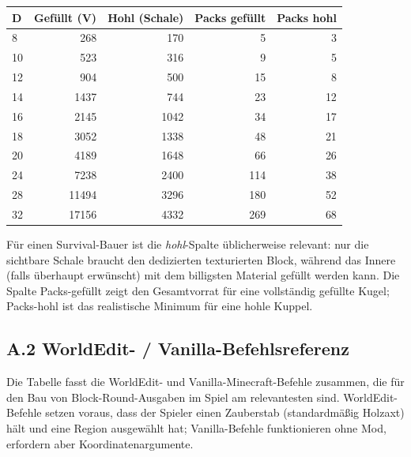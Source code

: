 \documentclass[12pt,a4paper]{scrartcl}
\begin{document}
\vspace{0.4em}
\begin{center}
\begin{tabular}{@{}lrrrr@{}}
\toprule
\textbf{D} & \textbf{Gefüllt (V)} & \textbf{Hohl (Schale)} & \textbf{Packs gefüllt} & \textbf{Packs hohl} \\
\midrule
8   &   268 &   170 &  5  &  3  \\
10  &   523 &   316 &  9  &  5  \\
12  &   904 &   500 & 15  &  8  \\
14  &  1437 &   744 & 23  & 12  \\
16  &  2145 &  1042 & 34  & 17  \\
18  &  3052 &  1338 & 48  & 21  \\
20  &  4189 &  1648 & 66  & 26  \\
24  &  7238 &  2400 & 114 & 38  \\
28  & 11494 &  3296 & 180 & 52  \\
32  & 17156 &  4332 & 269 & 68  \\
\bottomrule
\end{tabular}
\end{center}

Für einen Survival-Bauer ist die \emph{hohl}-Spalte üblicherweise relevant: nur die sichtbare Schale braucht den dedizierten texturierten Block, während das Innere (falls überhaupt erwünscht) mit dem billigsten Material gefüllt werden kann. Die Spalte Packs-gefüllt zeigt den Gesamtvorrat für eine vollständig gefüllte Kugel; Packs-hohl ist das realistische Minimum für eine hohle Kuppel.

\subsection*{A.2 WorldEdit- / Vanilla-Befehlsreferenz}
Die Tabelle fasst die WorldEdit- und Vanilla-Minecraft-Befehle zusammen, die für den Bau von Block-Round-Ausgaben im Spiel am relevantesten sind. WorldEdit-Befehle setzen voraus, dass der Spieler einen Zauberstab (standardmäßig Holzaxt) hält und eine Region ausgewählt hat; Vanilla-Befehle funktionieren ohne Mod, erfordern aber Koordinatenargumente.
\end{document}
